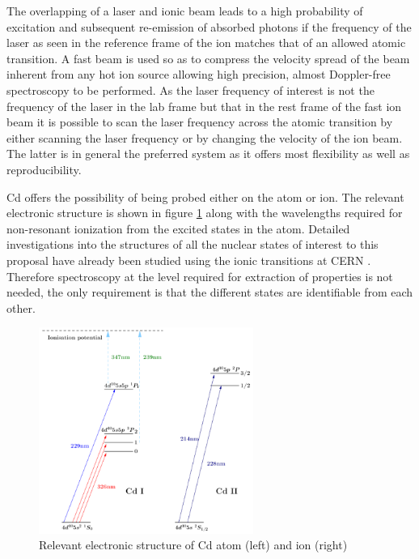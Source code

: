 \documentclass[12pt]{article}
\begin{document}
The overlapping of a laser and ionic beam leads to a high probability of excitation and subsequent re-emission of absorbed photons if the frequency of the laser as seen in the reference frame of the ion matches that of an allowed atomic transition. A fast beam is used so as to compress the velocity spread of the beam inherent from any hot ion source allowing  high precision, almost Doppler-free spectroscopy to be performed. As the laser frequency of interest is not the frequency of the laser in the lab frame but that in the rest frame of the fast ion beam it is possible to scan the laser frequency across the atomic transition by either scanning the laser frequency or by changing the velocity of the ion beam. The latter is in general the preferred system as it offers most flexibility as well as  reproducibility.

Cd offers the possibility of being probed either on the atom or ion. The relevant electronic structure is shown in figure \ref{fig:cdelectronic} along with the wavelengths required for non-resonant ionization from the excited states in the  atom. Detailed investigations into the structures of all the nuclear states of interest to this proposal have already been studied using the ionic transitions at CERN \cite{Yordanov2013,Yordanov2016}. Therefore spectroscopy at the level required for extraction of properties is not needed, the only requirement is that the different states are identifiable from each other.

\begin{figure}
\begin{center}
\includegraphics[width=7cm]{e_structure.png}
\caption{Relevant electronic structure of Cd atom (left) and ion (right)}
\label{fig:cdelectronic}
\end{center}
\end{figure}
\end{document}
